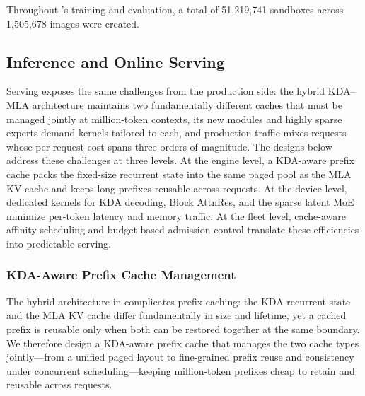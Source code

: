 Throughout 's training and evaluation, a total of 51{,}219{,}741 sandboxes across 1{,}505{,}678 images were created.


\subsection{Inference and Online Serving}
\label{sec:inference}

Serving  exposes the same challenges from the production side: the hybrid KDA--MLA architecture maintains two fundamentally different caches that must be managed jointly at million-token contexts, its new modules and highly sparse experts demand kernels tailored to each, and production traffic mixes requests whose per-request cost spans three orders of magnitude.
The designs below address these challenges at three levels.
At the engine level, a KDA-aware prefix cache packs the fixed-size recurrent state into the same paged pool as the MLA KV cache and keeps long prefixes reusable across requests.
At the device level, dedicated kernels for KDA decoding, Block AttnRes, and the sparse latent MoE minimize per-token latency and memory traffic.
At the fleet level, cache-aware affinity scheduling and budget-based admission control translate these efficiencies into predictable serving.

\subsubsection{KDA-Aware Prefix Cache Management}

The hybrid architecture in  complicates prefix caching: the KDA recurrent state and the MLA KV cache differ fundamentally in size and lifetime, yet a cached prefix is reusable only when both can be restored together at the same boundary.
We therefore design a KDA-aware prefix cache that manages the two cache types jointly---from a unified paged layout to fine-grained prefix reuse and consistency under concurrent scheduling---keeping million-token prefixes cheap to retain and reusable across requests.


